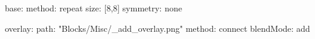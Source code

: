 base:
  method: repeat
  size: [8,8]
  symmetry: none

overlay:
  path: "Blocks/Misc/_add_overlay.png"
  method: connect
blendMode: add
